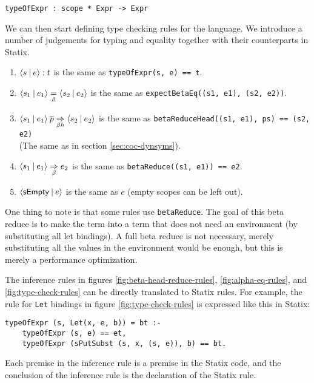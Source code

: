\begin{lstlisting}
typeOfExpr : scope * Expr -> Expr
\end{lstlisting}
We can then start defining type checking rules for the language. We introduce a number of judgements for typing and equality together with their counterparts in Statix.
\begin{enumerate}
	\item $\langle s \: | \: e\rangle : t$ is the same as \verb|typeOfExpr(s, e) == t|.
	\item $\langle s_1 \: | \: e_1\rangle \underset{\beta}{=} \langle s_2 \: | \: e_2\rangle$ is the same as \verb|expectBetaEq((s1, e1), (s2, e2))|.
	\item $\langle s_1 \: | \: e_1\rangle \: \overline{p} \underset{\beta h}{\Rightarrow} \langle s_2 \: | \: e_2\rangle$ is the same as \verb|betaReduceHead((s1, e1), ps) == (s2, e2)| \\ (The same as in section \ref{sec:coc-dynsyms}).
	\item $\langle s_1 \: | \: e_1\rangle \underset{\beta}{\Rightarrow} e_2$ is the same as \verb|betaReduce((s1, e1)) == e2|.
	\item $\langle\mathsf{sEmpty} \: | \: e\rangle$ is the same as $e$ (empty scopes can be left out).
\end{enumerate}

One thing to note is that some rules use \verb|betaReduce|. The goal of this beta reduce is to make the term into a term that does not need an environment (by substituting all let bindings). A full beta reduce is not necessary, merely substituting all the values in the environment would be enough, but this is merely a performance optimization.

The inference rules in figures \ref{fig:beta-head-reduce-rules}, \ref{fig:alpha-eq-rules}, and \ref{fig:type-check-rules} can be directly translated to Statix rules. For example, the rule for \verb|Let| bindings in figure \ref{fig:type-check-rules} is expressed like this in Statix:
\begin{lstlisting}
typeOfExpr (s, Let(x, e, b)) = bt :-
	typeOfExpr (s, e) == et, 
	typeOfExpr (sPutSubst (s, x, (s, e)), b) == bt.
\end{lstlisting}

Each premise in the inference rule is a premise in the Statix code, and the conclusion of the inference rule is the declaration of the Statix rule. 

